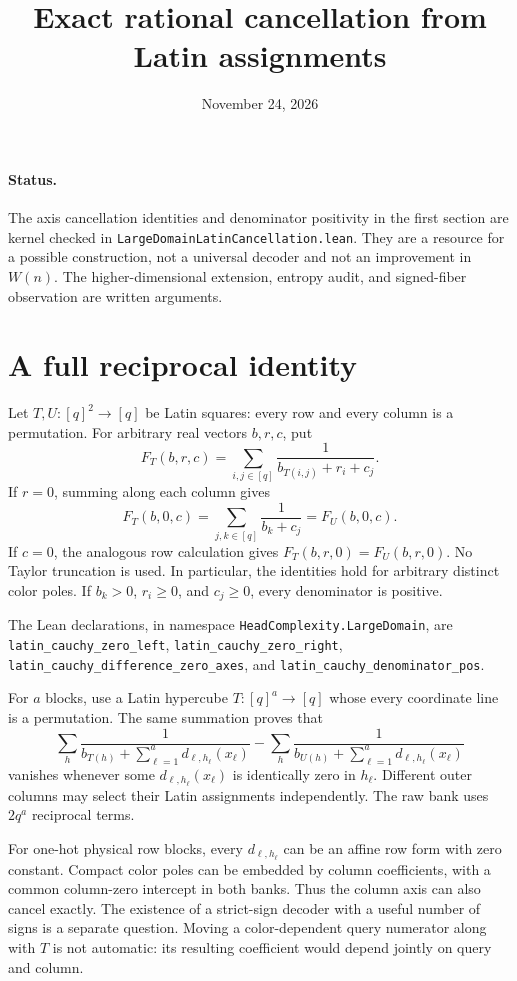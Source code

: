 \documentclass[11pt]{article}
\begin{document}
\title{Exact rational cancellation from Latin assignments}
\date{November 24, 2026}
\maketitle

\paragraph{Status.}
The axis cancellation identities and denominator positivity in the first
section are kernel checked in \texttt{LargeDomainLatinCancellation.lean}.
They are a resource for a possible construction, not a universal decoder
and not an improvement in $W(n)$. The higher-dimensional extension,
entropy audit, and signed-fiber observation are written arguments.

\section{A full reciprocal identity}
Let $T,U:[q]^2\to[q]$ be Latin squares: every row and every column is
a permutation. For arbitrary real vectors $b,r,c$, put
\[
 F_T(b,r,c)=\sum_{i,j\in[q]}\frac{1}{b_{T(i,j)}+r_i+c_j}.
\]
If $r=0$, summing along each column gives
\[
 F_T(b,0,c)=\sum_{j,k\in[q]}\frac{1}{b_k+c_j}=F_U(b,0,c).
\]
If $c=0$, the analogous row calculation gives $F_T(b,r,0)=F_U(b,r,0)$.
No Taylor truncation is used. In particular, the identities hold for
arbitrary distinct color poles. If $b_k>0$, $r_i\geq0$, and $c_j\geq0$,
every denominator is positive.

The Lean declarations, in namespace \texttt{HeadComplexity.LargeDomain},
are \texttt{latin\_cauchy\_zero\_left},
\texttt{latin\_cauchy\_zero\_right},
\texttt{latin\_cauchy\_difference\_zero\_axes}, and
\texttt{latin\_cauchy\_denominator\_pos}.

For $a$ blocks, use a Latin hypercube $T:[q]^a\to[q]$ whose every
coordinate line is a permutation. The same summation proves that
\[
 \sum_h\frac{1}{b_{T(h)}+\sum_{\ell=1}^a d_{\ell,h_\ell}(x_\ell)}
 -\sum_h\frac{1}{b_{U(h)}+\sum_{\ell=1}^a d_{\ell,h_\ell}(x_\ell)}
\]
vanishes whenever some $d_{\ell,h_\ell}(x_\ell)$ is identically zero
in $h_\ell$. Different outer columns may select their Latin assignments
independently. The raw bank uses $2q^a$ reciprocal terms.

For one-hot physical row blocks, every $d_{\ell,h_\ell}$ can be an
affine row form with zero constant. Compact color poles can be embedded
by column coefficients, with a common column-zero intercept in both
banks. Thus the column axis can also cancel exactly. The existence of a
strict-sign decoder with a useful number of signs is a separate question.
Moving a color-dependent query numerator along with $T$ is not automatic:
its resulting coefficient would depend jointly on query and column.
\end{document}
